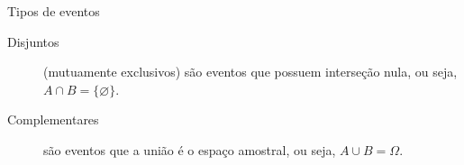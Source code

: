 \documentclass[10pt]{beamer}\usepackage[]{graphicx}\usepackage[]{color}
\theoremstyle{definition}
\begin{document}
\begin{frame}[fragile]{Tipos de eventos}
\begin{block}{}
\begin{description}
 \item[Disjuntos] (mutuamente exclusivos) são eventos que possuem
   interseção nula, ou seja, $A\cap B = \{\varnothing\}$.
 \item[Complementares] são eventos que a união é o espaço amostral, ou
   seja, $A\cup B = \Omega$.
\end{description}
\end{block}
\end{frame}




\end{document}
